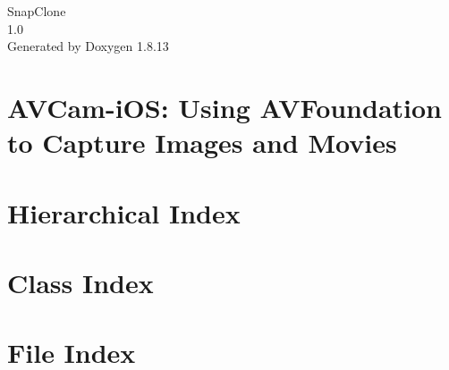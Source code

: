 \documentclass[twoside]{book}
\newcommand{\+}{\discretionary{\mbox{\scriptsize$\hookleftarrow$}}{}{}}
\newcommand{\clearemptydoublepage}{%
  \newpage{\pagestyle{empty}\cleardoublepage}%
}
\begin{document}
\hypersetup{pageanchor=false,
             bookmarksnumbered=true,
             pdfencoding=unicode
            }
\begin{titlepage}
\vspace*{7cm}
\begin{center}%
{\Large Snap\+Clone \\[1ex]\large 1.\+0 }\\
\vspace*{1cm}
{\large Generated by Doxygen 1.8.13}\\
\end{center}
\end{titlepage}
\clearemptydoublepage
{}
\tableofcontents
\clearemptydoublepage
{}
\hypersetup{pageanchor=true}

\chapter{A\+V\+Cam-\/i\+OS\+: Using A\+V\+Foundation to Capture Images and Movies}
\label{md__snap_main_dir__middle_camera_and_settings_view__picture_controller__a_v_cam__r_e_a_d_m_e}
\hypertarget{md__snap_main_dir__middle_camera_and_settings_view__picture_controller__a_v_cam__r_e_a_d_m_e}{}

\chapter{Hierarchical Index}

\chapter{Class Index}

\chapter{File Index}

\end{document}
